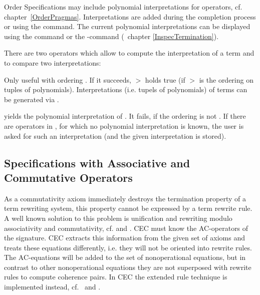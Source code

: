 Order Specifications may include polynomial interpretations for operators, cf. 
chapter~\ref{OrderPragmas}. Interpretations are added during the 
completion process or using the  command.
The current polynomial interpretations can be displayed using the
 command or the -command
(\ chapter \ref{InspecTermination}).

There are two operators which allow to compute the interpretation of a term
and to compare two interpretations:\bigskip

\begin{command}
Only useful with ordering .
If it succeeds,  $>$  holds true
(if $>$ is the ordering on tuples of polynomials).
Interpretations (i.e. tupels of polynomials) of terms can be generated
via .
\end{command}

\begin{command}
yields the polynomial interpretation of . It
fails, if the ordering is not . 
If there are operators in ,
for which no polynomial interpretation is known, the user is asked for
such an interpretation (and the given interpretation is stored).
\end{command}

\subsection{Specifications with Associative and Commutative Operators}

As a commutativity axiom immediately destroys the termination property of a term
rewriting system, this property cannot be expressed by a term rewrite rule. A well
known solution to this problem is unification and rewriting modulo associativity and
commutativity, cf. 
\cite{Sti81} and \cite{Fag83}. CEC must know the AC-operators of the
signature. CEC extracts this information from the given set of axioms and treats
these equations differently, i.e. they will not be oriented into rewrite rules.
The AC-equations will be added to the set of nonoperational equations, but in contrast
to other nonoperational equations they are not superposed with rewrite rules to compute 
coherence pairs. In CEC the extended rule technique is implemented instead,
cf.\ \cite{PS81} and \cite{JK86b}.


